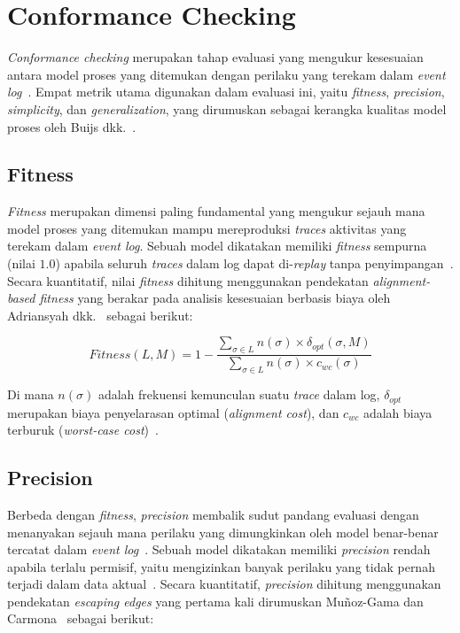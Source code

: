 \section{Conformance Checking}
\textit{Conformance checking} merupakan tahap evaluasi yang mengukur kesesuaian antara model proses yang ditemukan dengan perilaku yang terekam dalam \textit{event log}~\cite{carmona2018conformance}. Empat metrik utama digunakan dalam evaluasi ini, yaitu \textit{fitness}, \textit{precision}, \textit{simplicity}, dan \textit{generalization}, yang dirumuskan sebagai kerangka kualitas model proses oleh Buijs dkk.~\cite{buijs2014quality}.

\subsection{Fitness}
\textit{Fitness} merupakan dimensi paling fundamental yang mengukur sejauh mana model proses yang ditemukan mampu mereproduksi \textit{traces} aktivitas yang terekam dalam \textit{event log}. Sebuah model dikatakan memiliki \textit{fitness} sempurna (nilai $1.0$) apabila seluruh \textit{traces} dalam log dapat di-\textit{replay} tanpa penyimpangan~\cite{vanderAalst2016_process_mining}. Secara kuantitatif, nilai \textit{fitness} dihitung menggunakan pendekatan \textit{alignment-based fitness} yang berakar pada analisis kesesuaian berbasis biaya oleh Adriansyah dkk.~\cite{adriansyah2011conformance, adriansyah2012replaying} sebagai berikut:

\begin{equation}
    Fitness(L, M) = 1 - \frac{\sum_{\sigma \in L} n(\sigma) \times \delta_{opt}(\sigma, M)}{\sum_{\sigma \in L} n(\sigma) \times c_{wc}(\sigma)}
    \label{eq:fitness_formula}
\end{equation}

Di mana $n(\sigma)$ adalah frekuensi kemunculan suatu \textit{trace} dalam log, $\delta_{opt}$ merupakan biaya penyelarasan optimal (\textit{alignment cost}), dan $c_{wc}$ adalah biaya terburuk (\textit{worst-case cost})~\cite{adriansyah2012replaying}.

\subsection{Precision}
Berbeda dengan \textit{fitness}, \textit{precision} membalik sudut pandang evaluasi dengan menanyakan sejauh mana perilaku yang dimungkinkan oleh model benar-benar tercatat dalam \textit{event log}~\cite{carmona2018conformance, carmona2022conformance}. Sebuah model dikatakan memiliki \textit{precision} rendah apabila terlalu permisif, yaitu mengizinkan banyak perilaku yang tidak pernah terjadi dalam data aktual~\cite{carmona2018conformance}. Secara kuantitatif, \textit{precision} dihitung menggunakan pendekatan \textit{escaping edges} yang pertama kali dirumuskan Muñoz-Gama dan Carmona~\cite{munozgama2010precision, vanderAalst2016_process_mining} sebagai berikut:

